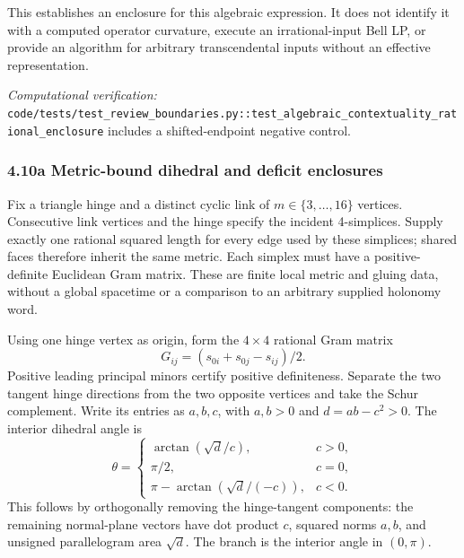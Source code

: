\documentclass[
  english,
  10pt,
  a4paper,
]{article}
\begin{document}
This establishes an enclosure for this algebraic expression. It does not
identify it with a computed operator curvature, execute an
irrational-input Bell LP, or provide an algorithm for arbitrary
transcendental inputs without an effective representation.

\emph{Computational verification:}
\nolinkurl{code/tests/test_review_boundaries.py::test_algebraic_contextuality_rational_enclosure}
includes a shifted-endpoint negative control.

\subsubsection{4.10a Metric-bound dihedral and deficit
enclosures}\label{a-metric-bound-dihedral-and-deficit-enclosures}

Fix a triangle hinge and a distinct cyclic link of
\(m\in\{3,\ldots,16\}\) vertices. Consecutive link vertices and the
hinge specify the incident 4-simplices. Supply exactly one rational
squared length for every edge used by these simplices; shared faces
therefore inherit the same metric. Each simplex must have a
positive-definite Euclidean Gram matrix. These are finite local metric
and gluing data, without a global spacetime or a comparison to an
arbitrary supplied holonomy word.

Using one hinge vertex as origin, form the \(4\times4\) rational Gram
matrix \[
G_{ij}=(s_{0i}+s_{0j}-s_{ij})/2.
\] Positive leading principal minors certify positive definiteness.
Separate the two tangent hinge directions from the two opposite vertices
and take the Schur complement. Write its entries as \(a,b,c\), with
\(a,b>0\) and \(d=ab-c^2>0\). The interior dihedral angle is \[
\theta=\begin{cases}
\arctan(\sqrt d/c),&c>0,\\
\pi/2,&c=0,\\
\pi-\arctan(\sqrt d/(-c)),&c<0.
\end{cases}
\] This follows by orthogonally removing the hinge-tangent components:
the remaining normal-plane vectors have dot product \(c\), squared norms
\(a,b\), and unsigned parallelogram area \(\sqrt d\). The branch is the
interior angle in \((0,\pi)\).
\end{document}
